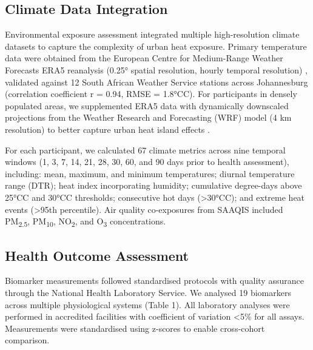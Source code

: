 \documentclass[11pt,a4paper]{article}
\newcommand{\degrees}{°C}
\begin{document}
\subsection{Climate Data Integration}

Environmental exposure assessment integrated multiple high-resolution climate datasets to capture the complexity of urban heat exposure. Primary temperature data were obtained from the European Centre for Medium-Range Weather Forecasts ERA5 reanalysis (0.25° spatial resolution, hourly temporal resolution) \citep{Hersbach2020}, validated against 12 South African Weather Service stations across Johannesburg (correlation coefficient r = 0.94, RMSE = 1.8\degrees C). For participants in densely populated areas, we supplemented ERA5 data with dynamically downscaled projections from the Weather Research and Forecasting (WRF) model (4 km resolution) to better capture urban heat island effects \citep{Skamarock2019}.

For each participant, we calculated 67 climate metrics across nine temporal windows (1, 3, 7, 14, 21, 28, 30, 60, and 90 days prior to health assessment), including: mean, maximum, and minimum temperatures; diurnal temperature range (DTR); heat index incorporating humidity; cumulative degree-days above 25\degrees C and 30\degrees C thresholds; consecutive hot days (>30\degrees C); and extreme heat events (>95th percentile). Air quality co-exposures from SAAQIS included PM\textsubscript{2.5}, PM\textsubscript{10}, NO\textsubscript{2}, and O\textsubscript{3} concentrations.

\subsection{Health Outcome Assessment}

Biomarker measurements followed standardised protocols with quality assurance through the National Health Laboratory Service. We analysed 19 biomarkers across multiple physiological systems (Table 1). All laboratory analyses were performed in accredited facilities with coefficient of variation <5\% for all assays. Measurements were standardised using z-scores to enable cross-cohort comparison.
\end{document}
